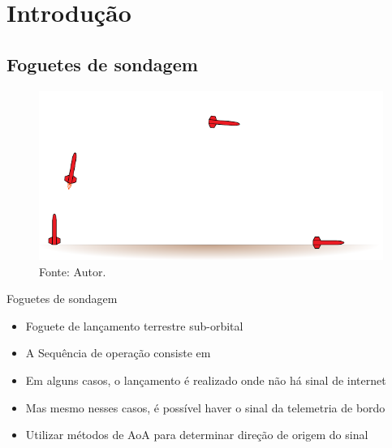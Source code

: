 \section{Introdução}

\subsection{Foguetes de sondagem}

\begin{frame}
    \begin{figure}
        \centering
        \includegraphics[width=\textwidth]{../pictures/conops.pdf}
        \caption*{\tiny Fonte: Autor.}
    \end{figure}
\end{frame}

\begin{frame}{Foguetes de sondagem}
    \begin{itemize}[<+->]\addtolength{\itemsep}{0.5\baselineskip}
        \item Foguete de lançamento terrestre sub-orbital
        \item A Sequência de operação consiste em 
        \item Em alguns casos, o lançamento é realizado onde não há sinal de internet
        \item Mas mesmo nesses casos, é possível haver o sinal da telemetria de bordo
        \item Utilizar métodos de AoA para determinar direção de origem do sinal
    \end{itemize}
\end{frame}

